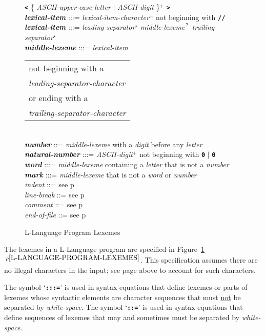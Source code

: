 \documentclass[12pt]{article}
\newcommand{\TT}[1]{{\tt \bfseries #1}}
\newcommand{\STAR}{{\Large $^\star$}}
\newcommand{\PLUS}[1][]{{$^{+#1}$}}
\newcommand{\QMARK}{{$^{\,\mbox{\footnotesize ?}}$}}
\newcommand{\ttkey}[1]{{\tt \bfseries #1}}
\newcommand{\emkey}[1]{{\em \bfseries #1}}
\newcommand{\itemref}[1]{\ref{#1}$\,^{p\pageref{#1}}$}
\newcommand{\pagref}[1]{p\pageref{#1}}
\newlength{\figurewidth}
\newenvironment{boxedfigure}[1][!btp]%
	{\begin{figure*}[#1]
	 \begin{lrbox}{\figurebox}
	 \begin{minipage}{\figurewidth}

	 \vspace*{1ex}}%
	{
	 \vspace*{1ex}

	 \end{minipage}
	 \end{lrbox}

	 \vspace*{-15ex}
	 \centering
	 \fbox{\hspace*{0.1in}\usebox{\figurebox}\hspace*{0.1in}}
	 \end{figure*}}
\newenvironment{indpar}[1][0.3in]%
	{\begin{list}{}%
		     {\setlength{\itemsep}{0in}%
		      \setlength{\topsep}{0in}%
		      \setlength{\parsep}{1ex}%
		      \setlength{\labelwidth}{#1}%
		      \setlength{\leftmargin}{#1}%
		      \addtolength{\leftmargin}{\labelsep}}%
	 \item}%
	{\end{list}}
\begin{document}
\begin{boxedfigure}[!p]
\begin{indpar}
\hspace*{0.5in}
    \TT{<} \{ {\em ASCII-upper-case-letter} $|$ {\em ASCII-digit}
            \}\PLUS{} \TT{>}
\\[1ex]
\emkey{lexical-item} :::= {\em lexical-item-character}\PLUS{}
                       not beginning with \TT{//}
\\[0.5ex]
\emkey{lexical-item} :::= {\em leading-separator}\STAR{}
			  {\em middle-lexeme}\QMARK{}
                          {\em trailing-separator}\STAR{}
\\[0.5ex]
\emkey{middle-lexeme} :::= 
	{\em lexical-item}
	\begin{tabular}[t]{@{}l@{}}
	not beginning with a \\
	{\em leading-separator-character} \\
	or ending with a \\
	{\em trailing-separator-character} \\
	\end{tabular}
\\[0.5ex]
\emkey{number}
    ::= {\em middle-lexeme} with a {\em digit} before any {\em letter}
\\[0.5ex]
\emkey{natural-number}\label{NATURAL-NUMBER}
	:::= {\em ASCII-digit}\PLUS{} not beginning with \TT{0} $|$ \TT{0}
\\[0.5ex]
\emkey{word} :::= {\em middle-lexeme} containing a {\em letter} that is not
                  a {\em number}
\\[0.5ex]
\emkey{mark} :::= {\em middle-lexeme} that is not a {\em word} or
		  {\em number}
\\[0.5ex]
{\em indent} ::= see \pagref{INDENT}
\\[0.5ex]
{\em line-break} ::= see \pagref{LINE-BREAK}
\\[0.5ex]
{\em comment} ::= see \pagref{COMMENT}
\\[0.5ex]
{\em end-of-file} ::= see \pagref{END-OF-FILE}

\end{indpar}
\caption{L-Language Program Lexemes}
\label{L-LANGUAGE-PROGRAM-LEXEMES}
\end{boxedfigure}

The lexemes in a L-Language program are specified in
Figure~\itemref{L-LANGUAGE-PROGRAM-LEXEMES}.  This specification assumes there
are no illegal characters in the input; see page \pageref{ILLEGAL-CHARACTERS}
above to account for such characters.

The symbol `\ttkey{:::=}' is used in syntax equations
that define lexemes or parts of lexemes whose syntactic elements are
character sequences that must \underline{not} be separated by {\em white-space}.
The symbol `\ttkey{::=}'
is used in syntax equations that define sequences of lexemes that may
and sometimes must be separated by {\em white-space}.
\end{document}
